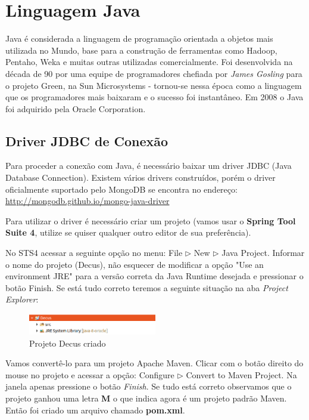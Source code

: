 \section{Linguagem Java}
Java é considerada a linguagem de programação orientada a objetos mais utilizada no Mundo, base para a construção de ferramentas como Hadoop, Pentaho, Weka e muitas outras utilizadas comercialmente. Foi desenvolvida na década de 90 por uma equipe de programadores chefiada por \textit{James Gosling} para o projeto Green, na Sun Microsystems - tornou-se nessa época como a linguagem que os programadores mais baixaram e o sucesso foi instantâneo. Em 2008 o Java foi adquirido pela Oracle Corporation.

\subsection{Driver JDBC de Conexão}
Para proceder a conexão com Java, é necessário baixar um driver JDBC (Java Database Connection). Existem vários drivers construídos, porém o driver oficialmente suportado pelo MongoDB se encontra no endereço: \url{http://mongodb.github.io/mongo-java-driver}

Para utilizar o driver é necessário criar um projeto (vamos usar o \textbf{Spring Tool Suite 4}, utilize se quiser qualquer outro editor de sua preferência).

No STS4 acessar a seguinte opção no menu: File $\triangleright$ New $\triangleright$ Java Project. Informar o nome do projeto (Decus), não esquecer de modificar a opção "Use an environment JRE" para a versão correta da Java Runtime desejada e pressionar o botão Finish. Se está tudo correto teremos a seguinte situação na aba \textit{Project Explorer}:
\begin{figure}[H]
	\centering
	\includegraphics[width=0.5\textwidth]{imagens/projetoCriado.png}
	\caption{Projeto Decus criado}
\end{figure}

Vamos convertê-lo para um projeto Apache Maven. Clicar com o botão direito do mouse no projeto e acessar a opção: Configure $\triangleright$ Convert to Maven Project. Na janela apenas pressione o botão \textit{Finish}. Se tudo está correto observamos que o projeto ganhou uma letra \textbf{M} o que indica agora é um projeto padrão Maven. Então foi criado um arquivo chamado \textbf{pom.xml}. 


